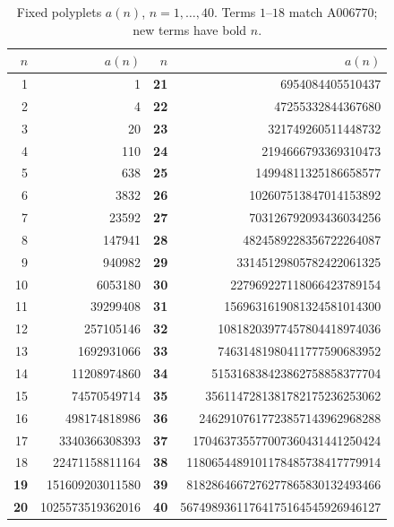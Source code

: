 \documentclass[11pt]{article}
\begin{document}
\begin{table}[H]
\centering
\begin{tabular}{r r @{\quad}|@{\quad} r r}
\toprule
$n$ & $a(n)$ & $n$ & $a(n)$\\
\midrule
1           & \num{1}                & \textbf{21} & \num{6954084405510437}\\
2           & \num{4}                & \textbf{22} & \num{47255332844367680}\\
3           & \num{20}               & \textbf{23} & \num{321749260511448732}\\
4           & \num{110}              & \textbf{24} & \num{2194666793369310473}\\
5           & \num{638}              & \textbf{25} & \num{14994811325186658577}\\
6           & \num{3832}             & \textbf{26} & \num{102607513847014153892}\\
7           & \num{23592}            & \textbf{27} & \num{703126792093436034256}\\
8           & \num{147941}           & \textbf{28} & \num{4824589228356722264087}\\
9           & \num{940982}           & \textbf{29} & \num{33145129805782422061325}\\
10          & \num{6053180}          & \textbf{30} & \num{227969227118066423789154}\\
11          & \num{39299408}         & \textbf{31} & \num{1569631619081324581014300}\\
12          & \num{257105146}        & \textbf{32} & \num{10818203977457804418974036}\\
13          & \num{1692931066}       & \textbf{33} & \num{74631481980411777590683952}\\
14          & \num{11208974860}      & \textbf{34} & \num{515316838423862758858377704}\\
15          & \num{74570549714}      & \textbf{35} & \num{3561147281381782175236253062}\\
16          & \num{498174818986}     & \textbf{36} & \num{24629107617723857143962968288}\\
17          & \num{3340366308393}    & \textbf{37} & \num{170463735577007360431441250424}\\
18          & \num{22471158811164}   & \textbf{38} & \num{1180654489101178485738417779914}\\
\textbf{19} & \num{151609203011580}  & \textbf{39} & \num{8182864667276277865830132493466}\\
\textbf{20} & \num{1025573519362016} & \textbf{40} & \num{56749893611764175164545926946127}\\
\bottomrule
\end{tabular}
\caption{Fixed polyplets $a(n)$, $n = 1,\dots,40$. Terms $1$--$18$ match
A006770; new terms have bold $n$.}
\label{tab:an}
\end{table}
\end{document}
